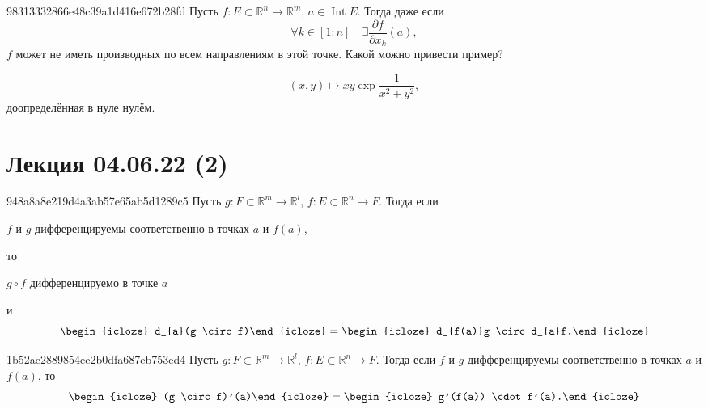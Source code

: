 \begin{note}{98313332866e48c39a1d416e672b28fd}
    Пусть \({ f : E \subset \mathbb R^{n} \to \mathbb R^{m} }\),\: \({ a \in \operatorname{Int} E }\).
    Тогда даже если
    \[
        \forall k \in [1 : n] \quad \exists \frac{\partial f}{\partial x_k}(a),
    \]
    \({ f }\)  может не иметь производных по всем направлениям в этой точке.
    Какой можно привести пример?

    \begin{cloze}{1}
        \[
            (x, y) \mapsto xy \exp \frac{1}{x^2 + y^2},
        \]
        доопределённая в нуле нулём.
    \end{cloze}
\end{note}

\section{Лекция 04.06.22 (2)}
\begin{note}{948a8a8e219d4a3ab57e65ab5d1289c5}
    Пусть \({ g : F \subset \mathbb R^{m} \to \mathbb R^{l} }\),\: \({ f : E \subset \mathbb R^{n} \to F }\).
    Тогда если \begin{icloze}{3}\({ f }\) и \({ g }\) дифференцируемы соответственно в точках \({ a }\) и \({ f(a) }\),\end{icloze} то
    \begin{icloze}{2}\({ g \circ f }\) дифференцируемо в точке \({ a }\)\end{icloze} и
    \[
        \begin{icloze}{4}d_{a}(g \circ f)\end{icloze} = \begin{icloze}{1}d_{f(a)}g \circ d_{a}f.\end{icloze}
    \]
\end{note}

\begin{note}{1b52ae2889854ee2b0dfa687eb753ed4}
    Пусть \({ g : F \subset \mathbb R^{m} \to \mathbb R^{l} }\),\: \({ f : E \subset \mathbb R^{n} \to F }\).
    Тогда если \({ f }\) и \({ g }\) дифференцируемы соответственно в точках \({ a }\) и \({ f(a) }\), то
    \[
        \begin{icloze}{2}(g \circ f)'(a)\end{icloze} = \begin{icloze}{1}g'(f(a)) \cdot f'(a).\end{icloze}
    \]
\end{note}

